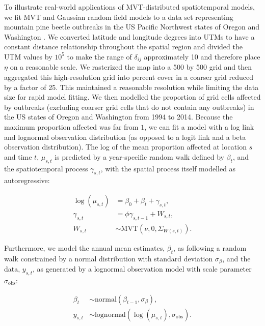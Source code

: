 \documentclass[12pt,english]{article}
\begin{document}
\begin{spacing}{1.9}
To illustrate real-world applications of MVT-distributed
spatiotemporal models,
we fit MVT and Gaussian random field models
to a data set representing
mountain pine beetle outbreaks in the
US Pacific Northwest states of Oregon and Washington \citep{usdaforestservice2017}.
We converted latitude and longitude degrees into UTMs to have a constant
distance relationship throughout the spatial region and divided the UTM values
by $10^5$ to make the range of $\delta_{ij}$ approximately 10 and therefore
place $\eta$ on a reasonable scale.
We rasterized the map into a 500 by 500 grid
and then aggregated this high-resolution grid
into percent cover in a coarser grid reduced by a factor of 25.
This maintained a reasonable resolution
while limiting the data size for rapid model fitting.
We then modelled the
proportion of grid cells affected by outbreaks
(excluding coarser grid cells that do not contain any outbreaks)
in the US states of Oregon and Washington from 1994 to 2014.
Because the maximum proportion affected was far from $1$, we
can fit a model with a log link and lognormal observation distribution
(as opposed to a logit link and a beta observation distribution).
The log of the mean proportion affected at location $s$ and time $t$, $\mu_{s,t}$
is predicted by a year-specific random walk defined by $\beta_t$,
and the spatiotemporal process $\gamma_{s,t}$,
with the spatial process itself modelled as autoregressive:

\begin{align}
  \log(\mu_{s,t}) &= \beta_0 + \beta_t + \gamma_{s,t},\\
  \gamma_{s,t} &= \phi \gamma_{s,t-1} + W_{s,t},\\ \label{eq:beetle-mu}
  W_{s,t} &\sim \mathrm{MVT}\left(\nu, 0, \Sigma_{W(s,t)}\right).
\end{align}

\noindent Furthermore, we model the annual
mean estimates, $\beta_t$, as following a random walk
constrained by a normal distribution with standard deviation $\sigma_{\beta}$,
and the data, $y_{s,t}$, as generated by a lognormal observation model
with scale parameter $\sigma_{\mathrm{obs}}$:

 \begin{align}
 \beta_t &\sim \mathrm{normal}\left( \beta_{t-1}, \sigma_{\beta} \right),\\
  y_{s,t} &\sim \mathrm{lognormal} \left(  \log(\mu_{s,t}), \sigma_{\mathrm{obs}} \right).
 \end{align}


\end{spacing}
\end{document}
